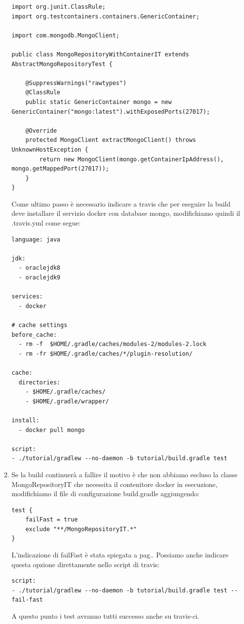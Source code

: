 \begin{enumerate}
\begin{lstlisting}[frame=single]
import org.junit.ClassRule;
import org.testcontainers.containers.GenericContainer;

import com.mongodb.MongoClient;

public class MongoRepositoryWithContainerIT extends AbstractMongoRepositoryTest {

	@SuppressWarnings("rawtypes")
	@ClassRule
	public static GenericContainer mongo = new GenericContainer("mongo:latest").withExposedPorts(27017);

	@Override
	protected MongoClient extractMongoClient() throws UnknownHostException {
		return new MongoClient(mongo.getContainerIpAddress(), mongo.getMappedPort(27017));
	}
}
    \end{lstlisting}
    Come ultimo passo è necessario indicare a travis che per eseguire la build deve installare il servizio docker con database mongo, modifichiamo quindi il .travis.yml come segue:
    \begin{verbatim}
language: java

jdk:
  - oraclejdk8
  - oraclejdk9

services:
  - docker

# cache settings
before_cache:
  - rm -f  $HOME/.gradle/caches/modules-2/modules-2.lock
  - rm -fr $HOME/.gradle/caches/*/plugin-resolution/

cache:
  directories:
    - $HOME/.gradle/caches/
    - $HOME/.gradle/wrapper/

install:
  - docker pull mongo

script:
- ./tutorial/gradlew --no-daemon -b tutorial/build.gradle test
  \end{verbatim}
  \item Se la build continuerà a fallire il motivo è che non abbiamo escluso la classe MongoRepositoryIT che necessita il contenitore docker in esecuzione, modifichiamo il file di configurazione build.gradle aggiungendo:
    \begin{verbatim}
test {
    failFast = true
    exclude "**/MongoRepositoryIT.*"   
}
  \end{verbatim}
  L'indicazione di failFast è stata spiegata a pag.\pageref{failfast}. Possiamo anche indicare questa opzione direttamente nello script di travis:
      \begin{verbatim}
script:
- ./tutorial/gradlew --no-daemon -b tutorial/build.gradle test --fail-fast
  \end{verbatim}
  A questo punto i test avranno tutti successo anche su travis-ci.
\end{enumerate}